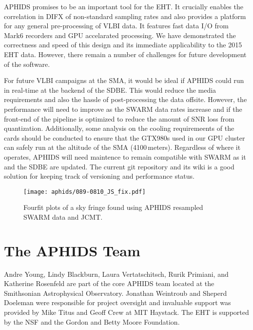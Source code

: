APHIDS promises to be an important tool for the EHT.  It crucially enables the correlation in
DIFX of non-standard sampling rates and also provides a platform for any general pre-processing of 
VLBI data.  It features fast data I/O from Mark6 recorders and GPU accelarated processing.  
We have demonstrated the correctness and speed of this design and its immediate applicability to 
the 2015 EHT data.  However,
there remain a number of challenges for future development of the software.

For future VLBI campaigns at the SMA, it would be ideal if APHIDS could run in real-time 
at the backend of the SDBE.  This would reduce the media requirements and also the 
hassle of post-processing the data offsite.  However, the performance will need to improve as the
SWARM data rates increase and if the front-end of the pipeline is optimized to reduce the 
amount of SNR loss from quantization.  Additionally, some analysis on the cooling requiremeents 
of the cards should be conducted to ensure that the GTX980s used in our GPU cluster can safely run 
at the altitude of the SMA (4100\,meters).  Regardless of where it operates, APHIDS will need 
maintence to remain compatible with SWARM as it and the SDBE are updated.  The current 
git repository and its wiki is a good solution for keeping track of versioning and performance status.

%
\begin{figure}
\texttt{[image: aphids/089-0810\_JS\_fix.pdf]}
\caption{Fourfit plots of a sky fringe found using APHIDS resampled SWARM data and JCMT.}
\label{fig:aphids_fringe}
\end{figure}

\section{The APHIDS Team}
Andre Young, Lindy Blackburn, Laura Vertatschitsch, Rurik Primiani, and Katherine Rosenfeld are part of 
the core APHIDS team located at the Smithsonian Astrophysical Observatory.  Jonathan Weintroub and Sheperd
Doeleman were responsible for project oversight and invaluable support was provided by Mike Titus and Geoff Crew at MIT
Haystack.  The EHT is supported by the NSF and the Gordon and Betty Moore Foundation.
